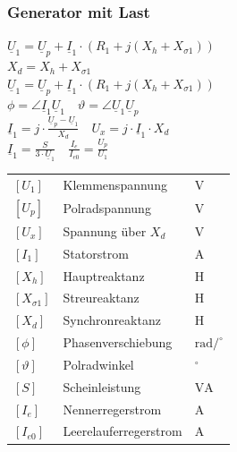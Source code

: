 \subsubsection{Generator mit Last}
\begin{minipage}[c]{0.46\columnwidth}
    $\boxed{\underline{U}_1 = \underline{U}_p +\underline{I}_1 \cdot\left(R_1+j(X_h+X_{\sigma1})\right)}$ \\
    $\boxed{X_d = X_h+X_{\sigma1}}$ \\
    $\boxed{\underline{U}_1 = \underline{U}_p +\underline{I}_1 \cdot(R_1+j(X_h+X_{\sigma1}))}$ \\
    $\boxed{\phi = \angle\underline{I}_1 \underline{U}_1} \quad \boxed{\vartheta = \angle\underline{U}_1\underline{U}_p}$ \\
    $\boxed{\underline{I}_1 = j\cdot \frac{\underline{U}_p-\underline{U}_1}{X_d}} \quad \boxed{U_x = j\cdot\underline{I}_1\cdot X_d}$\\
    $\boxed{\underline{I}_1= \frac{S}{3\cdot \underline{U}_1}} \quad \boxed{\frac{I_e}{I_{e0}}=\frac{U_p}{U_1}}$ \\
\end{minipage}
\hfill
\begin{minipage}[c]{0.53\columnwidth}
    \begin{tabular}{@{} l p{3.2cm} l @{}}
    $[U_1]$      & Klemmenspannung \dotfill & $\text{V}$ \\
    $[U_p]$      & Polradspannung \dotfill & $\mathrm{V}$ \\
    $[U_x]$      & Spannung über $X_d$ \dotfill& $\mathrm{V}$\\
    $[I_1]$ & Statorstrom \dotfill& $\mathrm{A}$ \\
    $[X_h]$  & Hauptreaktanz \dotfill& $\mathrm{H}$\\
    $[X_{\sigma1}]$   & Streureaktanz \dotfill& $\mathrm{H}$\\
    $[X_d]$  & Synchronreaktanz \dotfill& $\mathrm{H}$\\
    $[\phi]$  & Phasenverschiebung \dotfill& $\mathrm{rad/^\circ}$\\
    $[\vartheta]$  & Polradwinkel \dotfill& $\mathrm{^\circ}$\\
    $[S]$ & Scheinleistung \dotfill& $\mathrm{VA}$\\
    $[I_e]$ & Nennerregerstrom \dotfill& $\mathrm{A}$\\
    $[I_{e0}]$ & Leerelauferregerstrom \dotfill& $\mathrm{A}$\\
\end{tabular}
\end{minipage}

